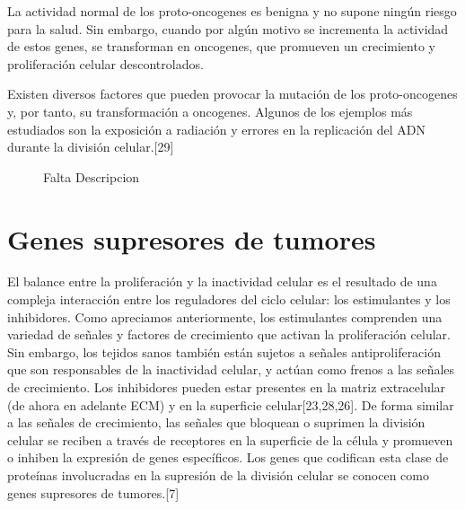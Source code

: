 \hspace{.1cm}La actividad normal de los proto-oncogenes es benigna y no supone ningún riesgo para la salud. Sin embargo, cuando por algún motivo se incrementa la actividad de estos genes, se transforman en oncogenes, que promueven un crecimiento y proliferación celular descontrolados.

\hspace{.1cm}Existen diversos factores que pueden provocar la mutación de los proto-oncogenes y, por tanto, su transformación a oncogenes. Algunos de los ejemplos más estudiados son la exposición a radiación y errores en la replicación del ADN durante la división celular.[29]

\begin{figure}[!ht]
\begin{center}
\end{center}\vspace*{-0.6cm}
\caption[Imagen de Oncogenes. Falta poner leyenda]{Falta Descripcion}
\label{fig-oncogen}
\end{figure}

\section{Genes supresores de tumores}
\hspace{.1cm}El balance entre la proliferación y la inactividad celular es el resultado de una compleja interacción entre los reguladores del ciclo celular: los estimulantes y los inhibidores. Como apreciamos anteriormente, los estimulantes comprenden una variedad de señales y factores de crecimiento que activan la proliferación celular. Sin embargo, los tejidos sanos también están sujetos a señales antiproliferación que son responsables de la inactividad celular, y actúan como frenos a las señales de crecimiento. Los inhibidores pueden estar presentes en la matriz extracelular (de ahora en adelante ECM) y en la superficie celular[23,28,26]. De forma similar a las señales de crecimiento, las señales que bloquean o suprimen la división celular se reciben a través de receptores en la superficie de la célula y promueven o inhiben la expresión de genes específicos. Los genes que codifican esta clase de proteínas involucradas en la supresión de la división celular se conocen como genes supresores de tumores.[7]

